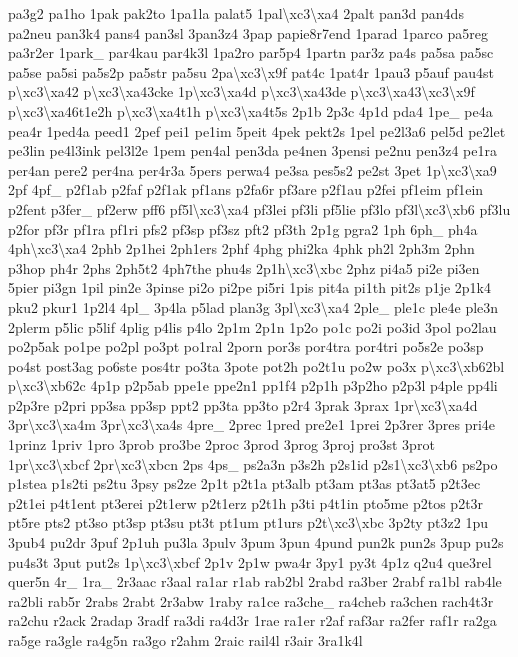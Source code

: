 {pa3g2 pa1ho 1pak pak2to 1pa1la palat5 1pal\textbackslash{}xc3\textbackslash{}xa4 2palt pan3d pan4ds pa2neu pan3k4 pans4 pan3sl 3pan3z4 3pap papie8r7end 1parad 1parco pa5reg pa3r2er 1park\-\_\- par4kau par4k3l 1pa2ro par5p4 1partn par3z pa4s pa5sa pa5sc pa5se pa5si pa5s2p pa5str pa5su 2pa\textbackslash{}xc3\textbackslash{}x9f pat4c 1pat4r 1pau3 p5auf pau4st p\textbackslash{}xc3\textbackslash{}xa42 p\textbackslash{}xc3\textbackslash{}xa43cke 1p\textbackslash{}xc3\textbackslash{}xa4d p\textbackslash{}xc3\textbackslash{}xa43de p\textbackslash{}xc3\textbackslash{}xa43\textbackslash{}xc3\textbackslash{}x9f p\textbackslash{}xc3\textbackslash{}xa46t1e2h p\textbackslash{}xc3\textbackslash{}xa4t1h p\textbackslash{}xc3\textbackslash{}xa4t5s 2p1b 2p3c 4p1d pda4 1pe\-\_\- pe4a pea4r 1ped4a peed1 2pef pei1 pe1im 5peit 4pek pekt2s 1pel pe2l3a6 pel5d pe2let pe3lin pe4l3ink pel3l2e 1pem pen4al pen3da pe4nen 3pensi pe2nu pen3z4 pe1ra per4an pere2 per4na per4r3a 5pers perwa4 pe3sa pes5s2 pe2st 3pet 1p\textbackslash{}xc3\textbackslash{}xa9 2pf 4pf\-\_\- p2f1ab p2faf p2f1ak pf1ans p2fa6r pf3are p2f1au p2fei pf1eim pf1ein p2fent p3fer\-\_\- pf2erw pff6 pf5l\textbackslash{}xc3\textbackslash{}xa4 pf3lei pf3li pf5lie pf3lo pf3l\textbackslash{}xc3\textbackslash{}xb6 pf3lu p2for pf3r pf1ra pf1ri pfs2 pf3sp pf3sz pft2 pf3th 2p1g pgra2 1ph 6ph\-\_\- ph4a 4ph\textbackslash{}xc3\textbackslash{}xa4 2phb 2p1hei 2ph1ers 2phf 4phg phi2ka 4phk ph2l 2ph3m 2phn p3hop ph4r 2phs 2ph5t2 4ph7the phu4s 2p1h\textbackslash{}xc3\textbackslash{}xbc 2phz pi4a5 pi2e pi3en 5pier pi3gn 1pil pin2e 3pinse pi2o pi2pe pi5ri 1pis pit4a pi1th pit2s p1je 2p1k4 pku2 pkur1 1p2l4 4pl\-\_\- 3p4la p5lad plan3g 3pl\textbackslash{}xc3\textbackslash{}xa4 2ple\-\_\- ple1c ple4e ple3n 2plerm p5lic p5lif 4plig p4lis p4lo 2p1m 2p1n 1p2o po1c po2i po3id 3pol po2lau po2p5ak po1pe po2pl po3pt po1ral 2porn por3s por4tra por4tri po5s2e po3sp po4st post3ag po6ste pos4tr po3ta 3pote pot2h po2t1u po2w po3x p\textbackslash{}xc3\textbackslash{}xb62bl p\textbackslash{}xc3\textbackslash{}xb62c 4p1p p2p5ab ppe1e ppe2n1 pp1f4 p2p1h p3p2ho p2p3l p4ple pp4li p2p3re p2pri pp3sa pp3sp ppt2 pp3ta pp3to p2r4 3prak 3prax 1pr\textbackslash{}xc3\textbackslash{}xa4d 3pr\textbackslash{}xc3\textbackslash{}xa4m 3pr\textbackslash{}xc3\textbackslash{}xa4s 4pre\-\_\- 2prec 1pred pre2e1 1prei 2p3rer 3pres pri4e 1prinz 1priv 1pro 3prob pro3be 2proc 3prod 3prog 3proj pro3st 3prot 1pr\textbackslash{}xc3\textbackslash{}xbcf 2pr\textbackslash{}xc3\textbackslash{}xbcn 2ps 4ps\-\_\- ps2a3n p3s2h p2s1id p2s1\textbackslash{}xc3\textbackslash{}xb6 ps2po p1stea p1s2ti ps2tu 3psy ps2ze 2p1t p2t1a pt3alb pt3am pt3as pt3at5 p2t3ec p2t1ei p4t1ent pt3erei p2t1erw p2t1erz p2t1h p3ti p4t1in pto5me p2tos p2t3r pt5re pts2 pt3so pt3sp pt3su pt3t pt1um pt1urs p2t\textbackslash{}xc3\textbackslash{}xbc 3p2ty pt3z2 1pu 3pub4 pu2dr 3puf 2p1uh pu3la 3pulv 3pum 3pun 4pund pun2k pun2s 3pup pu2s pu4s3t 3put put2s 1p\textbackslash{}xc3\textbackslash{}xbcf 2p1v 2p1w pwa4r 3py1 py3t 4p1z q2u4 que3rel quer5n 4r\-\_\- 1ra\-\_\- 2r3aac r3aal ra1ar r1ab rab2bl 2rabd ra3ber 2rabf ra1bl rab4le ra2bli rab5r 2rabs 2rabt 2r3abw 1raby ra1ce ra3che\-\_\- ra4cheb ra3chen rach4t3r ra2chu r2ack 2radap 3radf ra3di ra4d3r 1rae ra1er r2af raf3ar ra2fer raf1r ra2ga ra5ge ra3gle ra4g5n ra3go r2ahm 2raic rail4l r3air 3ra1k4l }
